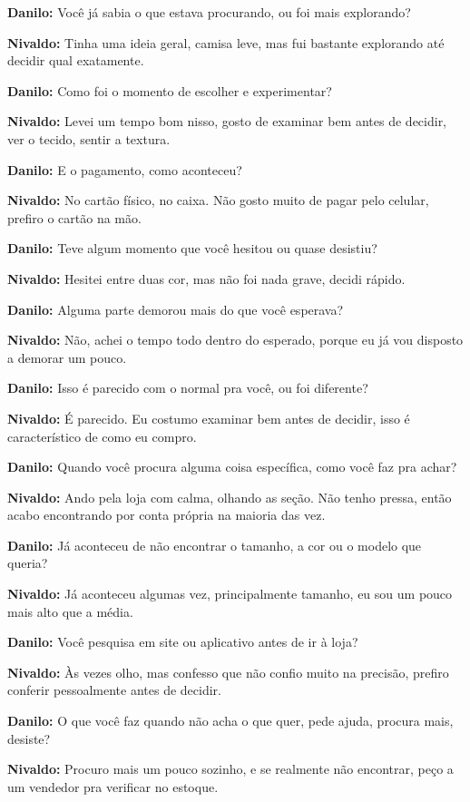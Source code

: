 \textbf{Danilo:} Você já sabia o que estava procurando, ou foi mais explorando?

\textbf{Nivaldo:} Tinha uma ideia geral, camisa leve, mas fui bastante explorando até decidir qual exatamente.

\textbf{Danilo:} Como foi o momento de escolher e experimentar?

\textbf{Nivaldo:} Levei um tempo bom nisso, gosto de examinar bem antes de decidir, ver o tecido, sentir a textura.

\textbf{Danilo:} E o pagamento, como aconteceu?

\textbf{Nivaldo:} No cartão físico, no caixa. Não gosto muito de pagar pelo celular, prefiro o cartão na mão.

\textbf{Danilo:} Teve algum momento que você hesitou ou quase desistiu?

\textbf{Nivaldo:} Hesitei entre duas cor, mas não foi nada grave, decidi rápido.

\textbf{Danilo:} Alguma parte demorou mais do que você esperava?

\textbf{Nivaldo:} Não, achei o tempo todo dentro do esperado, porque eu já vou disposto a demorar um pouco.

\textbf{Danilo:} Isso é parecido com o normal pra você, ou foi diferente?

\textbf{Nivaldo:} É parecido. Eu costumo examinar bem antes de decidir, isso é característico de como eu compro.

\textbf{Danilo:} Quando você procura alguma coisa específica, como você faz pra achar?

\textbf{Nivaldo:} Ando pela loja com calma, olhando as seção. Não tenho pressa, então acabo encontrando por conta própria na maioria das vez.

\textbf{Danilo:} Já aconteceu de não encontrar o tamanho, a cor ou o modelo que queria?

\textbf{Nivaldo:} Já aconteceu algumas vez, principalmente tamanho, eu sou um pouco mais alto que a média.

\textbf{Danilo:} Você pesquisa em site ou aplicativo antes de ir à loja?

\textbf{Nivaldo:} Às vezes olho, mas confesso que não confio muito na precisão, prefiro conferir pessoalmente antes de decidir.

\textbf{Danilo:} O que você faz quando não acha o que quer, pede ajuda, procura mais, desiste?

\textbf{Nivaldo:} Procuro mais um pouco sozinho, e se realmente não encontrar, peço a um vendedor pra verificar no estoque.

